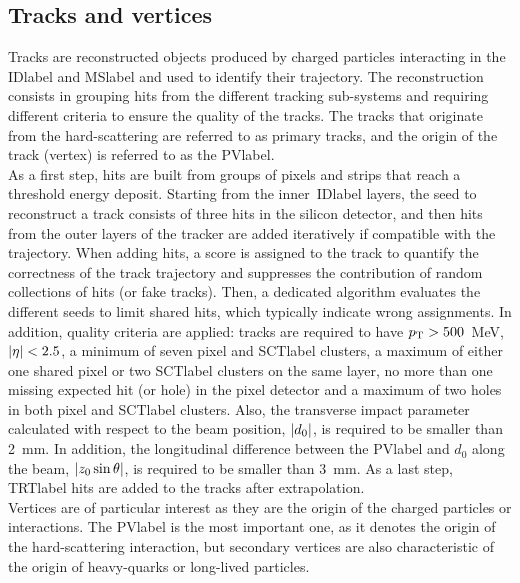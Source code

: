 \subsection{Tracks and vertices}

Tracks are reconstructed objects produced by charged particles interacting in the \acrshort{IDlabel} and \acrshort{MSlabel} and used to identify their trajectory. The reconstruction consists in grouping hits from the different tracking sub-systems and requiring different criteria to ensure the quality of the tracks. The tracks that originate from the hard-scattering are referred to as primary tracks, and the origin of the track (vertex) is referred to as the \acrfull{PVlabel}.\\

As a first step, hits are built from groups of pixels and strips that reach a threshold energy deposit. Starting from the inner~\acrshort{IDlabel} layers, the seed to reconstruct a track consists of three hits in the silicon detector, and then hits from the outer layers of the tracker are added iteratively if compatible with the trajectory. When adding hits, a score is assigned to the track to quantify the correctness of the track trajectory and suppresses the contribution of random collections of hits (or fake tracks). Then, a dedicated algorithm evaluates the different seeds to limit shared hits, which typically indicate wrong assignments. In addition, quality criteria are applied: tracks are required to have $p_{\text{T}}>500$~MeV, $\abs{\eta}<2.5$, a minimum of seven pixel and \acrshort{SCTlabel} clusters, a maximum of either one shared pixel or two \acrshort{SCTlabel} clusters on the same layer, no more than one missing expected hit (or hole) in the pixel detector and a maximum of two holes in both pixel and \acrshort{SCTlabel} clusters. Also, the transverse impact parameter calculated with respect to the beam position, $\abs{d_0}$, is required to be smaller than 2~mm. In addition, the longitudinal difference between the \acrshort{PVlabel} and $d_0$ along the beam, $\abs{z_0 \sin\theta}$, is required to be smaller than 3~mm. As a last step, \acrshort{TRTlabel} hits are added to the tracks after extrapolation.\\

Vertices are of particular interest as they are the origin of the charged particles or interactions. The \acrshort{PVlabel} is the most important one, as it denotes the origin of the hard-scattering interaction, but secondary vertices are also characteristic of the origin of heavy-quarks or long-lived particles.\\

